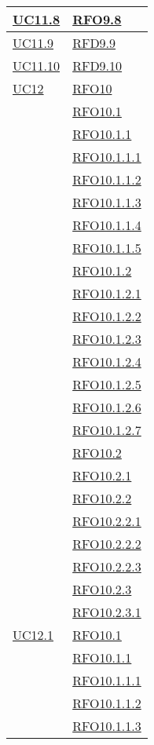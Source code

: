 \begin{longtable}{|>{\centering}m{5cm}|m{5cm}<{\centering}|}
\hyperlink{UC11.8}{UC11.8} & \hyperlink{RFO9.8}{RFO9.8}\\\hline
\hyperlink{UC11.9}{UC11.9} & \hyperlink{RFD9.9}{RFD9.9}\\\hline
\hyperlink{UC11.10}{UC11.10} & \hyperlink{RFD9.10}{RFD9.10}\\\hline
\hyperlink{UC12}{UC12} & \hyperlink{RFO10}{RFO10}\\
& \hyperlink{RFO10.1}{RFO10.1}\\
& \hyperlink{RFO10.1.1}{RFO10.1.1}\\
& \hyperlink{RFO10.1.1.1}{RFO10.1.1.1}\\
& \hyperlink{RFO10.1.1.2}{RFO10.1.1.2}\\
& \hyperlink{RFO10.1.1.3}{RFO10.1.1.3}\\
& \hyperlink{RFO10.1.1.4}{RFO10.1.1.4}\\
& \hyperlink{RFO10.1.1.5}{RFO10.1.1.5}\\
& \hyperlink{RFO10.1.2}{RFO10.1.2}\\
& \hyperlink{RFO10.1.2.1}{RFO10.1.2.1}\\
& \hyperlink{RFO10.1.2.2}{RFO10.1.2.2}\\
& \hyperlink{RFO10.1.2.3}{RFO10.1.2.3}\\
& \hyperlink{RFO10.1.2.4}{RFO10.1.2.4}\\
& \hyperlink{RFO10.1.2.5}{RFO10.1.2.5}\\
& \hyperlink{RFO10.1.2.6}{RFO10.1.2.6}\\
& \hyperlink{RFO10.1.2.7}{RFO10.1.2.7}\\
& \hyperlink{RFO10.2}{RFO10.2}\\
& \hyperlink{RFO10.2.1}{RFO10.2.1}\\
& \hyperlink{RFO10.2.2}{RFO10.2.2}\\
& \hyperlink{RFO10.2.2.1}{RFO10.2.2.1}\\
& \hyperlink{RFO10.2.2.2}{RFO10.2.2.2}\\
& \hyperlink{RFO10.2.2.3}{RFO10.2.2.3}\\
& \hyperlink{RFO10.2.3}{RFO10.2.3}\\
& \hyperlink{RFO10.2.3.1}{RFO10.2.3.1}\\\hline
\hyperlink{UC12.1}{UC12.1} & \hyperlink{RFO10.1}{RFO10.1}\\
& \hyperlink{RFO10.1.1}{RFO10.1.1}\\
& \hyperlink{RFO10.1.1.1}{RFO10.1.1.1}\\
& \hyperlink{RFO10.1.1.2}{RFO10.1.1.2}\\
& \hyperlink{RFO10.1.1.3}{RFO10.1.1.3}\\

\end{longtable}
